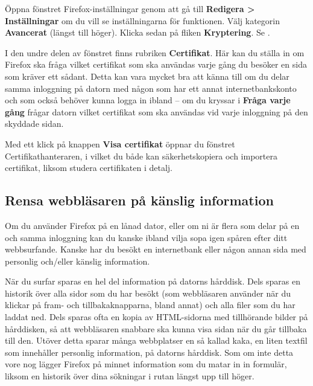 \documentclass[a4paper,final]{memoir} %
\begin{document}
Öppna fönstret Firefox-inställningar genom att gå till \textbf{Redigera \textgreater{} Inställningar} om du vill se inställningarna för funktionen. Välj kategorin \textbf{Avancerat} (längst till höger). Klicka sedan på fliken \textbf{Kryptering}. Se .


I den undre delen av fönstret finns rubriken \textbf{Certifikat}. Här kan du ställa in om Firefox ska fråga vilket certifikat som ska användas varje gång du besöker en sida som kräver ett sådant. Detta kan vara mycket bra att känna till om du delar samma inloggning på datorn med någon som har ett annat internetbankskonto och som också behöver kunna logga in ibland -- om du kryssar i \textbf{Fråga varje gång} frågar datorn vilket certifikat som ska användas vid varje inloggning på den skyddade sidan.

Med ett klick på knappen \textbf{Visa certifikat} öppnar du fönstret Certifikathanteraren, i vilket du både kan säkerhetskopiera och importera certifikat, liksom studera certifikaten i detalj.


\subsection{Rensa webbläsaren på känslig information}\label{firefox-radera}


Om du använder Firefox på en lånad dator, eller om ni är flera som delar på en och samma inloggning kan du kanske ibland vilja sopa igen spåren efter ditt webbsurfande. Kanske har du besökt en internetbank eller någon annan sida med personlig och/eller känslig information. 

När du surfar sparas en hel del information på datorns hårddisk. Dels sparas en historik över alla sidor som du har besökt (som webbläsaren använder när du klickar på fram- och tillbakaknapparna, bland annat) och alla filer som du har laddat ned. Dels sparas ofta en kopia av HTML-sidorna med tillhörande bilder på hårddisken, så att webbläsaren snabbare ska kunna visa sidan när du går tillbaka till den. Utöver detta sparar många webbplatser en så kallad kaka, en liten textfil som innehåller personlig information, på datorns hårddisk. Som om inte detta vore nog lägger Firefox på minnet information som du matar in in formulär, liksom en historik över dina sökningar i rutan längst upp till höger.
\end{document}

